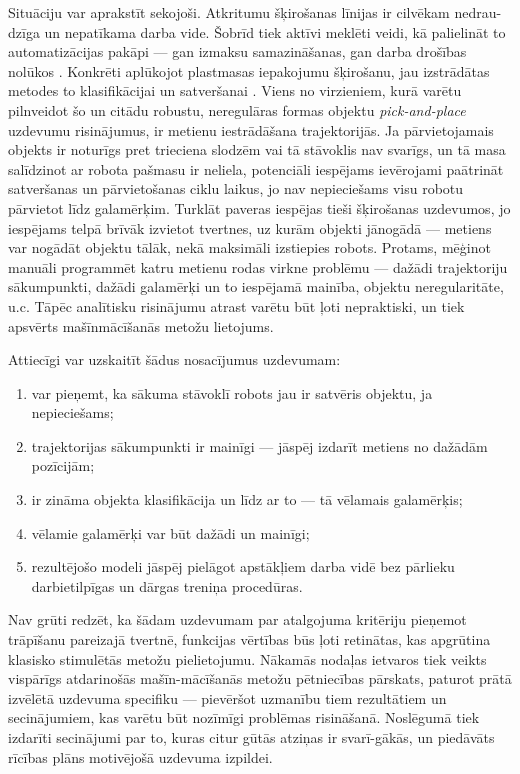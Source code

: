 \documentclass[12pt, a4paper]{article}
\numberwithin{equation}{section} %
\begin{document}
Situāciju var aprakstīt sekojoši. Atkritumu šķirošanas līnijas ir cilvēkam nedrau-dzīga un nepatīkama darba vide. Šobrīd tiek aktīvi meklēti veidi, kā palielināt to automatizācijas pakāpi --- gan izmaksu samazināšanas, gan darba drošības nolūkos \cite{trashbot}. Konkrēti aplūkojot plastmasas iepakojumu šķirošanu, jau izstrādātas metodes to klasifikācijai un satveršanai \cite{trashbot}. Viens no virzieniem, kurā varētu pilnveidot šo un citādu robustu, neregulāras formas objektu \textit{pick-and-place} uzdevumu risinājumus, ir metienu iestrādāšana trajektorijās. Ja pārvietojamais objekts ir noturīgs pret trieciena slodzēm vai tā stāvoklis nav svarīgs, un tā masa salīdzinot ar robota pašmasu ir neliela, potenciāli iespējams ievērojami paātrināt satveršanas un pārvietošanas ciklu laikus, jo nav nepieciešams visu robotu pārvietot līdz galamērķim. Turklāt paveras iespējas tieši šķirošanas uzdevumos, jo iespējams telpā brīvāk izvietot tvertnes, uz kurām objekti jānogādā --- metiens var nogādāt objektu tālāk, nekā maksimāli izstiepies robots. Protams, mēģinot manuāli programmēt katru metienu rodas virkne problēmu --- dažādi trajektoriju sākumpunkti, dažādi galamērķi un to iespējamā mainība, objektu neregularitāte, u.c. Tāpēc analītisku risinājumu atrast varētu būt ļoti nepraktiski, un tiek apsvērts mašīnmācīšanās metožu lietojums.

Attiecīgi var uzskaitīt šādus nosacījumus uzdevumam:
\begin{enumerate}
    \item var pieņemt, ka sākuma stāvoklī robots jau ir satvēris objektu, ja nepieciešams;
    \item trajektorijas sākumpunkti ir mainīgi --- jāspēj izdarīt metiens no dažādām pozīcijām;
    \item ir zināma objekta klasifikācija un līdz ar to --- tā vēlamais galamērķis;
    \item vēlamie galamērķi var būt dažādi un mainīgi;
    \item rezultējošo modeli jāspēj pielāgot apstākļiem darba vidē bez pārlieku darbietilpīgas un dārgas treniņa procedūras.
\end{enumerate}

Nav grūti redzēt, ka šādam uzdevumam par atalgojuma kritēriju pieņemot trāpīšanu pareizajā tvertnē, funkcijas vērtības būs ļoti retinātas, kas apgrūtina klasisko stimulētās metožu pielietojumu. Nākamās nodaļas ietvaros tiek veikts vispārīgs atdarinošās mašīn-mācīšanās metožu pētniecības pārskats, paturot prātā izvēlētā uzdevuma specifiku --- pievēršot uzmanību tiem rezultātiem un secinājumiem, kas varētu būt nozīmīgi problēmas risināšanā. Noslēgumā tiek izdarīti secinājumi par to, kuras citur gūtās atziņas ir svarī-gākās, un piedāvāts rīcības plāns motivējošā uzdevuma izpildei.
\end{document}
